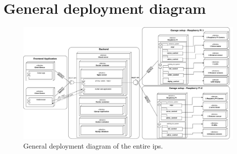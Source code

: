 \section{General deployment diagram}\label{app:deployment-diagram}
\begin{landscape}
   \begin{figure}
    \centering
    \includegraphics[width=25cm]{images/deployment_diagrams/deployment_diagram-general.drawio.png}
    \caption{General deployment diagram of the entire \ac{ips}.}
    \label{fig:general-deployment-diagram}
\end{figure}
\end{landscape}

\clearpage